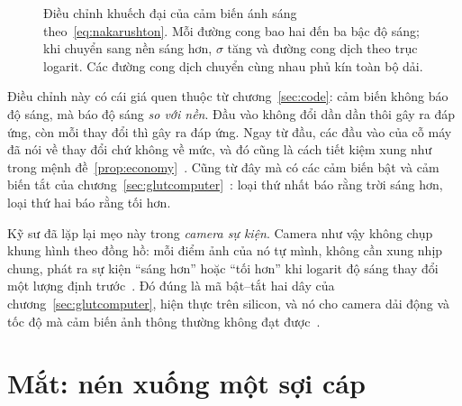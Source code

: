 \begin{figure}[t]
\centering
{}
\caption{Điều chỉnh khuếch đại của cảm biến ánh sáng theo~\eqref{eq:nakarushton}. Mỗi đường cong bao hai đến ba bậc độ sáng; khi chuyển sang nền sáng hơn, $\sigma$ tăng và đường cong dịch theo trục logarit. Các đường cong dịch chuyển cùng nhau phủ kín toàn bộ dải.}
\label{fig:adaptation}
\end{figure}

Điều chỉnh này có cái giá quen thuộc từ chương~\ref{sec:code}: cảm biến không báo độ sáng, mà báo độ sáng \emph{so với nền}. Đầu vào không đổi dần dần thôi gây ra đáp ứng, còn mỗi thay đổi thì gây ra đáp ứng. Ngay từ đầu, các đầu vào của cỗ máy đã nói về thay đổi chứ không về mức, và đó cũng là cách tiết kiệm xung như trong mệnh đề~\ref{prop:economy}~\cite{Barlow1961}. Cũng từ đây mà có các cảm biến bật và cảm biến tắt của chương~\ref{sec:glutcomputer}~\cite{Schiller1992}: loại thứ nhất báo rằng trời sáng hơn, loại thứ hai báo rằng tối hơn.

Kỹ sư đã lặp lại mẹo này trong \emph{camera sự kiện}. Camera như vậy không chụp khung hình theo đồng hồ: mỗi điểm ảnh của nó tự mình, không cần xung nhịp chung, phát ra sự kiện ``sáng hơn'' hoặc ``tối hơn'' khi logarit độ sáng thay đổi một lượng định trước~\cite{Lichtsteiner2008}. Đó đúng là mã bật--tắt hai dây của chương~\ref{sec:glutcomputer}, hiện thực trên silicon, và nó cho camera dải động và tốc độ mà cảm biến ảnh thông thường không đạt được~\cite{Gallego2022}.

\section{Mắt: nén xuống một sợi cáp}

